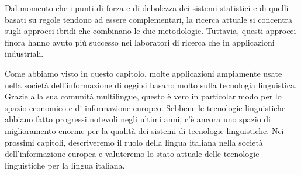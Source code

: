 \documentclass[]{../../metanetpaper}
\begin{document}
\begin{multicols}{2}
Dal momento che i punti di forza e di debolezza dei sistemi statistici e di
quelli basati su regole tendono ad essere complementari, la ricerca attuale si
concentra sugli approcci ibridi che combinano le due metodologie. Tuttavia,
questi approcci finora hanno avuto pi\`{u} successo nei laboratori di ricerca
che in applicazioni industriali.


Come abbiamo visto in questo capitolo, molte applicazioni ampiamente usate
nella societ\`{a} dell'informazione di oggi si basano molto sulla tecnologia
linguistica. Grazie alla sua comunit\`{a} multilingue, questo \`{e} vero in
particolar modo per lo spazio economico e di informazione europeo. Sebbene le
tecnologie linguistiche abbiano fatto progressi notevoli negli ultimi anni,
c'\`{e} ancora uno spazio di miglioramento enorme per la qualit\`{a} dei
sistemi di tecnologie linguistiche. Nei prossimi capitoli, descriveremo il
ruolo della lingua italiana nella societ\`{a} dell'informazione europea e
valuteremo lo stato attuale delle tecnologie linguistiche per la lingua
italiana.

\end{multicols}

\clearpage




\end{document}
